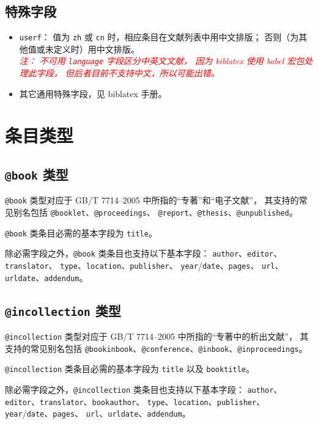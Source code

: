 \documentclass[UTF8, fancyhdr, hyperref]{ctexart}
\newcommand{\myemph}[1]{\emph{\textcolor{red}{#1}}}
\begin{document}
\subsection{特殊字段}

\begin{itemize}
	\item \verb|userf|：
		值为 \verb|zh| 或 \verb|cn| 时，相应条目在文献列表中用中文排版；
		否则（为其他值或未定义时）用中文排版。\\
		\myemph{%
			注：
			不可用 \texttt{language} 字段区分中英文文献，
			因为 biblatex 使用 babel\supercite{babel} 宏包处理此字段，
			但后者目前不支持中文，所以可能出错。%
		}
	\item 其它通用特殊字段，见 biblatex 手册\supercite{biblatex}。
\end{itemize}

\section{条目类型}\label{sec:entries}
\subsection{\texttt{@book} 类型}

\verb|@book| 类型对应于 GB/T 7714--2005 中所指的“专著”和“电子文献”，
其支持的常见别名包括 \verb|@booklet|、\verb|@proceedings|、%
\verb|@report|、\verb|@thesis|、\verb|@unpublished|。

\verb|@book| 类条目必需的基本字段为 \verb|title|。

除必需字段之外，\verb|@book| 类条目也支持以下基本字段：%
\verb|author|、\verb|editor|、\verb|translator|、%
\verb|type|、\verb|location|、\verb|publisher|、%
\verb|year|/\verb|date|、\verb|pages|、%
\verb|url|、\verb|urldate|、\verb|addendum|。

\subsection{\texttt{@incollection} 类型}

\verb|@incollection| 类型对应于 GB/T 7714--2005 中所指的“专著中的析出文献”，
其支持的常见别名包括
\verb|@bookinbook|、\verb|@conference|、\verb|@inbook|、\verb|@inproceedings|。

\verb|@incollection| 类条目必需的基本字段为 \verb|title| 以及 \verb|booktitle|。

除必需字段之外，\verb|@incollection| 类条目也支持以下基本字段：%
\verb|author|、\verb|editor|、\verb|translator|、\verb|bookauthor|、%
\verb|type|、\verb|location|、\verb|publisher|、%
\verb|year|/\verb|date|、\verb|pages|、%
\verb|url|、\verb|urldate|、\verb|addendum|。
\end{document}
